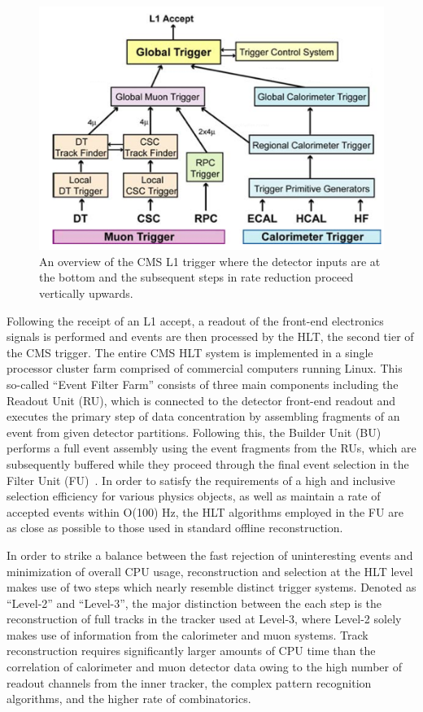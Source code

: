\begin{figure}
  \centering
  \includegraphics[width=\textwidth]{figs/trigger2}
  \caption{An overview of the CMS L1 trigger where the detector inputs are at the bottom and the subsequent steps in rate reduction proceed vertically upwards.}
  \label{fig:L1T}
\end{figure}

Following the receipt of an L1 accept, a readout of the front-end electronics signals is performed and events are then processed by the HLT, the second tier of the CMS trigger. The entire CMS HLT system is implemented in a single processor cluster farm comprised of commercial computers running Linux. This so-called ``Event Filter Farm'' consists of three main components including the Readout Unit (RU), which is connected to the detector front-end readout and executes the primary step of data concentration by assembling fragments of an event from given detector partitions. Following this, the Builder Unit (BU) performs a full event assembly using the event fragments from the RUs, which are subsequently buffered while they proceed through the final event selection in the Filter Unit (FU)~\cite{Andre}. In order to satisfy the requirements of a high and inclusive selection efficiency for various physics objects, as well as maintain a rate of accepted events within O(100) Hz, the HLT algorithms employed in the FU are as close as possible to those used in standard offline reconstruction. 

In order to strike a balance between the fast rejection of uninteresting events and minimization of overall CPU usage, reconstruction and selection at the HLT level makes use of two steps which nearly resemble distinct trigger systems. Denoted as ``Level-2'' and ``Level-3'', the major distinction between the each step is the reconstruction of full tracks in the tracker used at Level-3, where Level-2 solely makes use of information from the calorimeter and muon systems. Track reconstruction requires significantly larger amounts of CPU time than the correlation of calorimeter and muon detector data owing to the high number of readout channels from the inner tracker, the complex pattern recognition algorithms, and the higher rate of combinatorics. 

